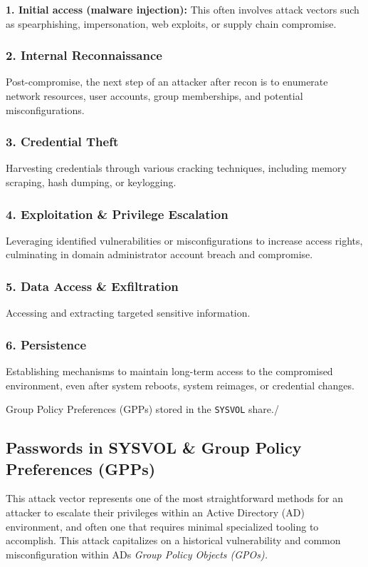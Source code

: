 \textbf{1. Initial access (malware injection): } This often involves attack vectors such as spearphishing, impersonation, web exploits, or supply chain compromise.

\subsubsection{2. Internal Reconnaissance}
Post-compromise, the next step of an attacker after recon is to enumerate network resources, user accounts, group memberships, and potential misconfigurations.

\subsubsection{3. Credential Theft}
Harvesting credentials through various cracking techniques, including memory scraping, hash dumping, or keylogging.

\subsubsection{4. Exploitation & Privilege Escalation}
Leveraging identified vulnerabilities or misconfigurations to increase access rights, culminating in domain administrator account breach and compromise.

\subsubsection{5. Data Access & Exfiltration}
Accessing and extracting targeted sensitive information.

\subsubsection{6. Persistence}
Establishing mechanisms to maintain long-term access to the compromised environment, even after system reboots, system reimages, or credential changes.

Group Policy Preferences (GPPs) stored in the \texttt{SYSVOL} share./

\subsection{Passwords in SYSVOL \& Group Policy Preferences (GPPs)}

This attack vector represents one of the most straightforward methods for an attacker to escalate their privileges within an Active Directory (AD) environment, and often one that requires minimal specialized tooling to accomplish. This attack capitalizes on a historical vulnerability and common misconfiguration within ADs \textit{Group Policy Objects (GPOs).}


